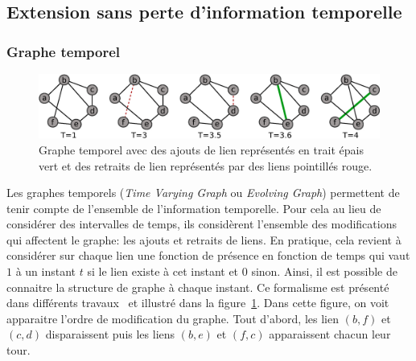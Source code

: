
\subsection{Extension sans perte d'information temporelle}
\label{subsec:pasperte_info}
\subsubsection{Graphe temporel}
\begin{figure}[h]
\centering
\includegraphics[width=0.9\linewidth]{img/Intro/evolvingGraph.eps}
\caption{Graphe temporel avec des ajouts de lien représentés en trait épais vert et des retraits de lien représentés par des liens pointillés rouge.
}
\label{fig:exemple_evolving}
\end{figure}
Les graphes temporels (\emph{Time Varying Graph} ou \emph{Evolving Graph})
permettent de tenir compte de l'ensemble de l'information temporelle.
Pour cela au lieu de considérer des intervalles de temps, ils considèrent l'ensemble des modifications qui affectent le graphe: les ajouts et retraits de liens.
En pratique, cela revient à considérer sur chaque lien une fonction de présence en fonction de temps qui vaut $1$ à un instant $t$ si le lien existe à cet instant et $0$ sinon.
Ainsi, il est possible de connaitre la structure de graphe à chaque instant.
Ce formalisme est présenté dans différents travaux~\cite{Casteigts2011,Wehmuth2015} et illustré dans la figure~\ref{fig:exemple_evolving}.
Dans cette figure, on voit apparaitre l'ordre de modification du graphe.
Tout d'abord, les lien $(b,f)$ et $(c,d)$ disparaissent puis les liens $(b,e)$ et $(f,c)$ apparaissent chacun leur tour. 

